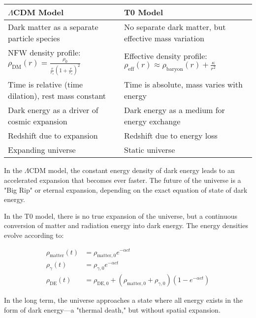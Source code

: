 \documentclass[a4paper,12pt]{article}
\theoremstyle{definition}
\theoremstyle{remark}
\begin{document}
	\begin{tcolorbox}[colback=yellow!5!white,colframe=yellow!75!black,title=Comparison of Models]
		\begin{tabular}{p{}|p{}}
			\toprule
			\textbf{$\Lambda$CDM Model} & \textbf{T0 Model} \\
			\midrule
			Dark matter as a separate particle species & No separate dark matter, but effective mass variation \\
			\midrule
			NFW density profile: $\rho_{\text{DM}}(r) = \frac{\rho_0}{\frac{r}{r_s}(1 + \frac{r}{r_s})^2}$ & Effective density profile: $\rho_{\text{eff}}(r) \approx \rho_{\text{baryon}}(r) + \frac{\kappa}{r^2}$ \\
			\midrule
			Time is relative (time dilation), rest mass constant & Time is absolute, mass varies with energy \\
			\midrule
			Dark energy as a driver of cosmic expansion & Dark energy as a medium for energy exchange \\
			\midrule
			Redshift due to expansion & Redshift due to energy loss \\
			\midrule
			Expanding universe & Static universe \\
			\bottomrule
		\end{tabular}
	\end{tcolorbox}
	
	In the $\Lambda$CDM model, the constant energy density of dark energy leads to an accelerated expansion that becomes ever faster. The future of the universe is a "Big Rip" or eternal expansion, depending on the exact equation of state of dark energy.
	
	In the T0 model, there is no true expansion of the universe, but a continuous conversion of matter and radiation energy into dark energy. The energy densities evolve according to:
	
	\begin{align}
		\rho_{\text{matter}}(t) &= \rho_{\text{matter},0} e^{-\alpha c t} \\
		\rho_{\gamma}(t) &= \rho_{\gamma,0} e^{-\alpha c t} \\
		\rho_{\text{DE}}(t) &= \rho_{\text{DE},0} + (\rho_{\text{matter},0} + \rho_{\gamma,0})(1 - e^{-\alpha c t})
	\end{align}
	
	In the long term, the universe approaches a state where all energy exists in the form of dark energy—a "thermal death," but without spatial expansion.
	
\end{document}

